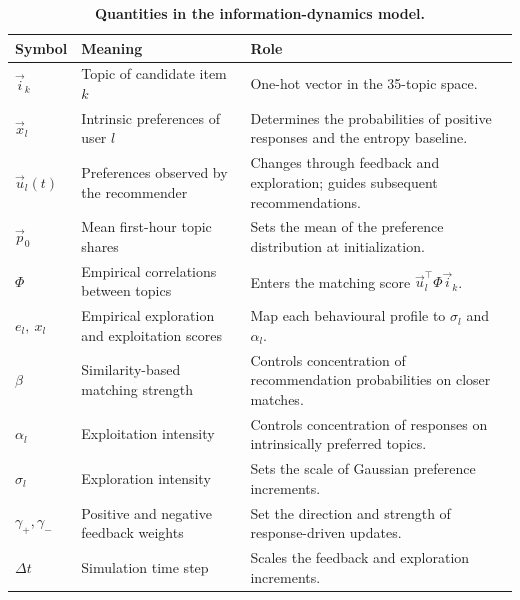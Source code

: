 \begin{table}[!htbp]\centering
\caption{\textbf{Quantities in the information-dynamics model.}}\label{tab:notation}
\begin{tabularx}{\linewidth}{@{}l >{\raggedright\arraybackslash}X >{\raggedright\arraybackslash}X@{}}\toprule
Symbol & Meaning & Role \\ \midrule
$\vec{i}_k$ & Topic of candidate item $k$ & One-hot vector in the 35-topic space. \\
$\vec{x}_l$ & Intrinsic preferences of user $l$ & Determines the probabilities of positive responses and the entropy baseline. \\
$\vec{u}_l(t)$ & Preferences observed by the recommender & Changes through feedback and exploration; guides subsequent recommendations. \\
$\vec{p}_0$ & Mean first-hour topic shares & Sets the mean of the preference distribution at initialization. \\
$\Phi$ & Empirical correlations between topics & Enters the matching score $\vec{u}_l^{\top}\Phi\vec{i}_k$. \\
$e_l,\ x_l$ & Empirical exploration and exploitation scores & Map each behavioural profile to $\sigma_l$ and $\alpha_l$. \\
$\beta$ & Similarity-based matching strength & Controls concentration of recommendation probabilities on closer matches. \\
$\alpha_l$ & Exploitation intensity & Controls concentration of responses on intrinsically preferred topics. \\
$\sigma_l$ & Exploration intensity & Sets the scale of Gaussian preference increments. \\
$\gamma_+,\gamma_-$ & Positive and negative feedback weights & Set the direction and strength of response-driven updates. \\
$\Delta t$ & Simulation time step & Scales the feedback and exploration increments. \\
\bottomrule\end{tabularx}
\end{table}

